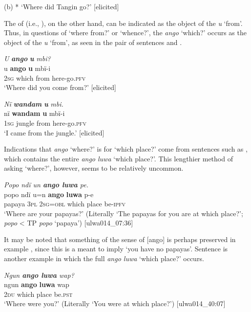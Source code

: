     (b) * ‘Where did Tangin go?’ [elicited]
\z

The  of  (i.e., ), on the other hand, can be indicated as the object of the  \textit{u} ‘from’. Thus, in questions of ‘where from?’ or ‘whence?’, the  \textit{ango} ‘which?’ occurs as the object of the  \textit{u} ‘from’, as seen in the pair of sentences  and .

\ea%
    \label{ex:syntax:47}
          \textit{U} \textbf{\textit{ango}} \textbf{\textit{u}} \textit{mbi?}\\
\gll    u    \textbf{ango}  \textbf{u}    mbï-i\\
    \textsc{2sg}  which  from  here-go.\textsc{pfv}\\
\glt `Where did you come from?’ [elicited]
\z

\ea%
    \label{ex:syntax:48}
          \textit{Nï} \textbf{\textit{wandam}} \textbf{\textit{u}} \textit{mbi.}\\
\gll    nï    \textbf{wandam}  \textbf{u}    mbï-i\\
    \textsc{1sg}  jungle    from  here-go.\textsc{pfv}\\
\glt `I came from the jungle.’ [elicited]
\z

Indications that \textit{ango} ‘where?’ is  for ‘which place?’ come from sentences such as , which contains the entire  \textit{ango luwa} ‘which place?’. This lengthier method of asking ‘where?’, however, seems to be relatively uncommon.

\ea%
    \label{ex:syntax:49}
          \textit{Popo ndï un \textbf{ango luwa} pe.}\\
\gll    popo  ndï  u=n    \textbf{ango}  \textbf{luwa}  p-e\\
    papaya  3\textsc{pl}  \textsc{2sg=obl}  which  place  be\textsc{{}-ipfv}\\
\glt `Where are your papayas?’ (Literally ‘The papayas for you are at which place?’; \textit{popo} < TP \textit{popo} ‘papaya’) [ulwa014\_07:36]
\z

It may be noted that something of the  sense of [ango] is perhaps preserved in example , since this is a  meant to imply ‘you have no papayas’. Sentence  is another example in which the full  \textit{ango luwa} ‘which place?’ occurs.

\ea%
    \label{ex:syntax:50}
          \textit{Ngun \textbf{ango luwa} wap?}\\
\gll    ngun  \textbf{ango}  \textbf{luwa}  wap\\
    2\textsc{du}  which  place  be.\textsc{pst}\\
\glt `Where were you?’ (Literally ‘You were at which place?’) [ulwa014\_40:07]
\z

